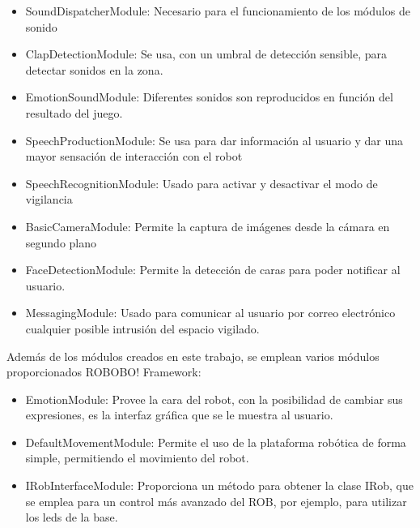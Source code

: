 \begin{itemize}
	\item SoundDispatcherModule: Necesario para el funcionamiento de los módulos de sonido
	\item ClapDetectionModule: Se usa, con un umbral de detección sensible, para detectar sonidos en la zona.
	\item EmotionSoundModule: Diferentes sonidos son reproducidos en función del resultado del juego.
	\item SpeechProductionModule: Se usa para dar información al usuario y dar una mayor sensación de interacción con el robot
	\item SpeechRecognitionModule: Usado para activar y desactivar el modo de vigilancia
	\item BasicCameraModule: Permite la captura de imágenes desde la cámara en segundo plano
	\item FaceDetectionModule: Permite la detección de caras para poder notificar al usuario.
	\item MessagingModule: Usado para comunicar al usuario por correo electrónico cualquier posible intrusión del espacio vigilado.
\end{itemize}

Además de los módulos creados en este trabajo, se emplean varios módulos proporcionados ROBOBO! Framework:

\begin{itemize}
	\item EmotionModule: Provee la cara del robot, con la posibilidad de cambiar sus expresiones, es la interfaz gráfica que se le muestra al usuario.
	\item DefaultMovementModule: Permite el uso de la plataforma robótica de forma simple, permitiendo el movimiento del robot.
	\item IRobInterfaceModule: Proporciona un método para obtener la clase IRob, que se emplea para un control más avanzado del ROB, por ejemplo, para utilizar los leds de la base.
\end{itemize}

